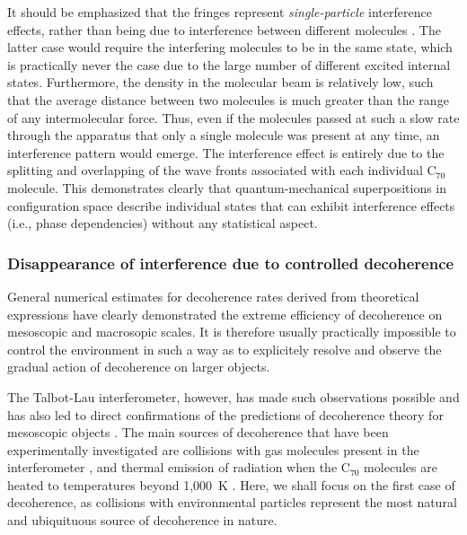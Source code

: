 \documentclass[12pt,aps,floatfix,amsmath,amssymb,showpacs,nofootinbib]{revtex4-2}
\begin{document}
It should be emphasized that the fringes represent {\em
  single-particle} interference effects, rather than being due to
interference between different molecules \cite{Nairz:2003:um}. The
latter case would require the interfering molecules to be in the same
state, which is practically never the case due to the large number of
different excited internal states. Furthermore, the density in the
molecular beam is relatively low, such that the average distance
between two molecules is much greater than the range of any
intermolecular force. Thus, even if the molecules passed at such a
slow rate through the apparatus that only a single molecule was
present at any time, an interference pattern would emerge. The
interference effect is entirely due to the splitting and overlapping
of the wave fronts associated with each individual C$_{70}$ molecule.
This demonstrates clearly that quantum-mechanical superpositions in
configuration space describe individual states that can exhibit
interference effects (i.e., phase dependencies) without any
statistical aspect.


\subsubsection{Disappearance of interference
  due to controlled decoherence} \label{sec:diffrac-dec}

General numerical estimates for decoherence rates derived from
theoretical expressions
\cite{Joos:1985:iu,Gallis:1990:un,Tegmark:1993:uz,Hornberger:2003:un}
have clearly demonstrated the extreme efficiency of decoherence on
mesoscopic and macrosopic scales. It is therefore usually practically
impossible to control the environment in such a way as to explicitely
resolve and observe the gradual action of decoherence on larger
objects.

The Talbot-Lau interferometer, however, has made such observations
possible and has also led to direct confirmations of the predictions
of decoherence theory for mesoscopic objects
\cite{Hackermuller:2003:uu,Hornberger:2003:tv,%
Hackermuller:2004:rd,Hornberger:2004:bb,Hornberger:2005:mo}. The main sources of
decoherence that have been experimentally investigated are collisions
with gas molecules present in the interferometer
\cite{Hornberger:2003:tv,Hackermuller:2003:uu,Hornberger:2004:bb}, and
thermal emission of radiation when the C$_{70}$ molecules are heated
to temperatures beyond 1,000~K
\cite{Hackermuller:2004:rd,Hornberger:2005:mo}. Here, we shall focus
on the first case of decoherence, as collisions with environmental
particles represent the most natural and ubiquituous source of
decoherence in nature.
\end{document}
